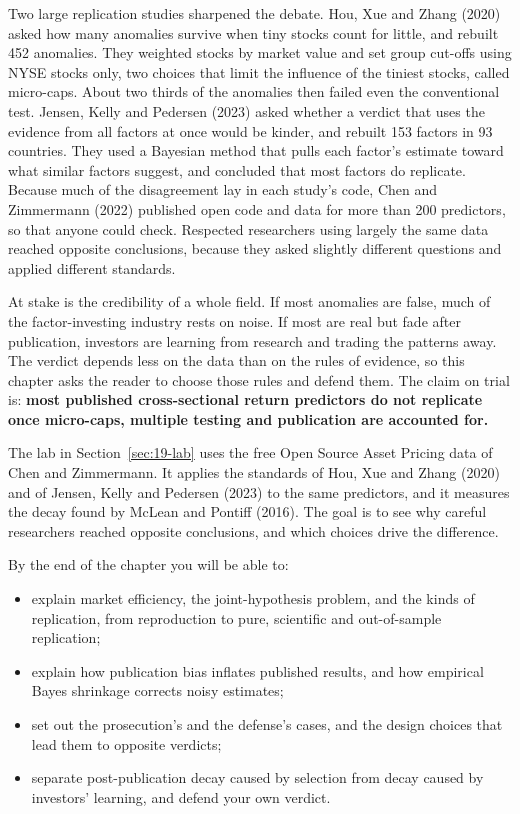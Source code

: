 Two large replication studies sharpened the debate. Hou, Xue and Zhang (2020) asked how many anomalies survive when tiny stocks count for little, and rebuilt 452 anomalies. They weighted stocks by market value and set group cut-offs using NYSE stocks only, two choices that limit the influence of the tiniest stocks, called micro-caps. About two thirds of the anomalies then failed even the conventional test. Jensen, Kelly and Pedersen (2023) asked whether a verdict that uses the evidence from all factors at once would be kinder, and rebuilt 153 factors in 93 countries. They used a Bayesian method that pulls each factor's estimate toward what similar factors suggest, and concluded that most factors do replicate. Because much of the disagreement lay in each study's code, Chen and Zimmermann (2022) published open code and data for more than 200 predictors, so that anyone could check. Respected researchers using largely the same data reached opposite conclusions, because they asked slightly different questions and applied different standards.

At stake is the credibility of a whole field. If most anomalies are false, much of the factor-investing industry rests on noise. If most are real but fade after publication, investors are learning from research and trading the patterns away. The verdict depends less on the data than on the rules of evidence, so this chapter asks the reader to choose those rules and defend them. The claim on trial is: \textbf{most published cross-sectional return predictors do not replicate once micro-caps, multiple testing and publication are accounted for.}

The lab in Section~\ref{sec:19-lab} uses the free Open Source Asset Pricing data of Chen and Zimmermann. It applies the standards of Hou, Xue and Zhang (2020) and of Jensen, Kelly and Pedersen (2023) to the same predictors, and it measures the decay found by McLean and Pontiff (2016). The goal is to see why careful researchers reached opposite conclusions, and which choices drive the difference.

By the end of the chapter you will be able to:

\begin{itemize}
  \item explain market efficiency, the joint-hypothesis problem, and the kinds of replication, from reproduction to pure, scientific and out-of-sample replication;
  \item explain how publication bias inflates published results, and how empirical Bayes shrinkage corrects noisy estimates;
  \item set out the prosecution's and the defense's cases, and the design choices that lead them to opposite verdicts;
  \item separate post-publication decay caused by selection from decay caused by investors' learning, and defend your own verdict.
\end{itemize}


